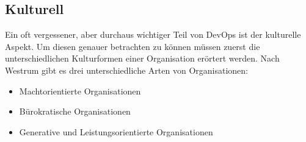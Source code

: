 \subsection{Kulturell}
Ein oft vergessener, aber durchaus wichtiger Teil von DevOps ist der kulturelle Aspekt. Um diesen genauer betrachten zu können müssen zuerst die unterschiedlichen Kulturformen einer Organisation erörtert werden.
Nach Westrum \parencite[Vgl.][]{westrum:2004} gibt es drei unterschiedliche Arten von Organisationen:

\begin{itemize}
\item Machtorientierte Organisationen
\item Bürokratische Organisationen
\item Generative und Leistungsorientierte Organisationen
\end{itemize}

